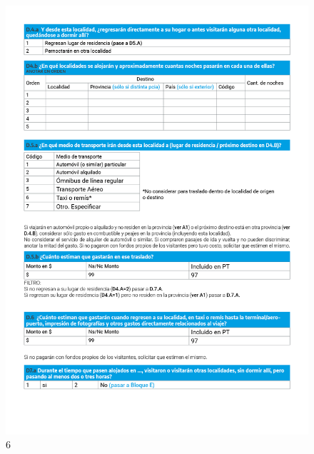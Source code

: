 \documentclass[
]{book}
\begin{document}
\begin{figure}

{\centering \includegraphics[width=1\linewidth]{imagenes/graf06} 

}

\caption{6}\label{fig:006}
\end{figure}
\end{document}
